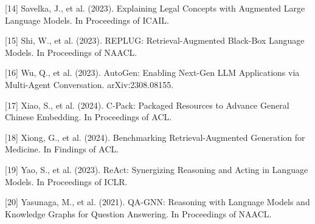 \documentclass[
]{article}
\begin{document}
{[}14{]} Savelka, J., et al. (2023). Explaining Legal Concepts with
Augmented Large Language Models. In Proceedings of ICAIL.

{[}15{]} Shi, W., et al. (2023). REPLUG: Retrieval-Augmented Black-Box
Language Models. In Proceedings of NAACL.

{[}16{]} Wu, Q., et al. (2023). AutoGen: Enabling Next-Gen LLM
Applications via Multi-Agent Conversation. arXiv:2308.08155.

{[}17{]} Xiao, S., et al. (2024). C-Pack: Packaged Resources to Advance
General Chinese Embedding. In Proceedings of ACL.

{[}18{]} Xiong, G., et al. (2024). Benchmarking Retrieval-Augmented
Generation for Medicine. In Findings of ACL.

{[}19{]} Yao, S., et al. (2023). ReAct: Synergizing Reasoning and Acting
in Language Models. In Proceedings of ICLR.

{[}20{]} Yasunaga, M., et al. (2021). QA-GNN: Reasoning with Language
Models and Knowledge Graphs for Question Answering. In Proceedings of
NAACL.
\end{document}
